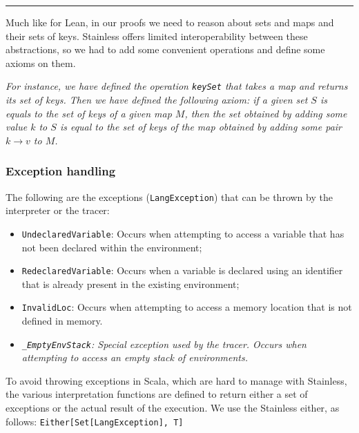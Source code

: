 \noindent\rule{0.3\textwidth}{.4pt}

Much like for Lean, in our proofs we need to reason about sets and maps and their sets of keys. Stainless offers limited interoperability between these abstractions, so we had to add some convenient operations and define some axioms on them.

\textit{For instance, we have defined the operation \texttt{keySet} that takes a map and returns its set of keys. Then we have defined the following axiom: if a given set $S$ is equals to the set of keys of a given map $M$, then the set obtained by adding some value $k$ to $S$ is equal to the set of keys of the map obtained by adding some pair $k \rightarrow v$ to $M$.}



\subsubsection{Exception handling}

The following are the exceptions (\texttt{LangException}) that can be thrown by the interpreter or the tracer:

\begin{itemize}
  \item \texttt{UndeclaredVariable}: Occurs when attempting to access a variable that has not been declared within the environment;
  \item \texttt{RedeclaredVariable}: Occurs when a variable is declared using an identifier that is already present in the existing environment;
  \item \texttt{InvalidLoc}: Occurs when attempting to access a memory location that is not defined in memory.

  \item \textit{\texttt{_EmptyEnvStack}: Special exception used by the tracer. Occurs when attempting to access an empty stack of environments.}
\end{itemize}

To avoid throwing exceptions in Scala, which are hard to manage with Stainless, the various interpretation functions are defined to return either a set of exceptions or the actual result of the execution. We use the Stainless either, as follows: \texttt{Either[Set[LangException], T]}


